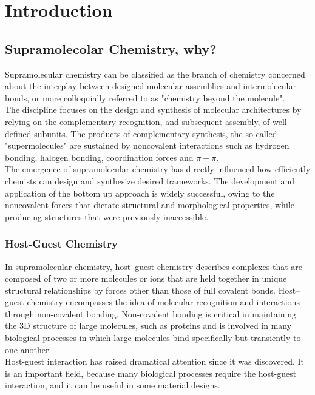 \documentclass[../Master.tex]{subfiles}
\begin{document}
\chapter{Introduction}
\section{Supramolecolar Chemistry, why?}
\label{sec:supramolecular-chemistry}
Supramolecular chemistry can be classified as the branch of chemistry concerned about the interplay between designed molecular assemblies and intermolecular bonds, or more colloquially referred to as "chemistry beyond the molecule". \\
The discipline focuses on the design and synthesis of molecular architectures by relying on the complementary recognition, and subsequent assembly, of well-defined subunits. The products of complementary synthesis, the so-called "supermolecules" are sustained by noncovalent interactions such as hydrogen bonding, halogen bonding, coordination forces and \(\pi-\pi\). \\
The emergence of supramolecular chemistry has directly influenced how efficiently chemists can design and synthesize desired frameworks. The development and application of the bottom up approach is widely successful, owing to the noncovalent forces that dictate structural and morphological properties, while producing structures that were previously inaccessible.

\subsection{Host-Guest Chemistry}

In supramolecular chemistry, host–guest chemistry describes complexes that are composed of two or more molecules or ions that are held together in unique structural relationships by forces other than those of full covalent bonds. Host–guest chemistry encompasses the idea of molecular recognition and interactions through non-covalent bonding. Non-covalent bonding is critical in maintaining the 3D structure of large molecules, such as proteins and is involved in many biological processes in which large molecules bind specifically but transiently to one another.\\
Host-guest interaction has raised dramatical attention since it was discovered. It is an important field, because many biological processes require the host-guest interaction, and it can be useful in some material designs.
\end{document}
